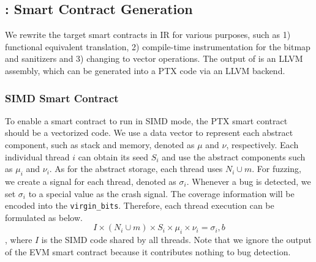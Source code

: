 \subsection{{\translator}: Smart Contract Generation}
\label{design:translator}
We rewrite the target smart contracts in IR for various purposes, such as 1) functional equivalent translation, 2) compile-time instrumentation for the bitmap and sanitizers and 3) changing to vector operations.
%
The output of {\translator} is an LLVM assembly, which can be generated into a PTX code via an LLVM backend.
%

\subsubsection{SIMD Smart Contract}
To enable a smart contract to run in SIMD mode, the PTX smart contract should be a vectorized code\cite{nuzman2011vapor}. 
%
We use a data vector to represent each abstract component, such as stack and memory, denoted as $\mu$ and $\nu$, respectively. 
Each individual thread $i$ can obtain its seed $S_i$ and use the abstract components such as $\mu_i$ and $\nu_i$. 
As for the abstract storage, each thread uses $N_i \cup m$.
For fuzzing, we create a signal for each thread, denoted as $\sigma_i$. 
Whenever a bug is detected, we set $\sigma_i$ to a special value as the crash signal. 
The coverage information will be encoded into the \texttt{virgin\_bits}.
Therefore, each thread execution can be formulated as below.
$$
I \times (N_i \cup m) \times S_i \times \mu_i \times \nu_i = \sigma_i, b
$$
, where $I$ is the SIMD code shared by all threads. 
Note that we ignore the output of the EVM smart contract because it contributes nothing to bug detection.
%

